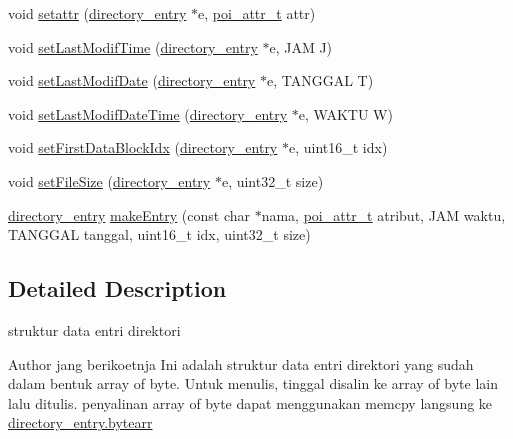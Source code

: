 \begin{DoxyCompactItemize}
\item 
void \hyperlink{directory-entry_8h_ab707665b70d7b489fea00097a365302b}{setattr} (\hyperlink{structdirectory__entry}{directory\-\_\-entry} $\ast$e, \hyperlink{structpoi__attr__t}{poi\-\_\-attr\-\_\-t} attr)
\item 
void \hyperlink{directory-entry_8h_a0dbc96b3055551072fccce217082e16a}{set\-Last\-Modif\-Time} (\hyperlink{structdirectory__entry}{directory\-\_\-entry} $\ast$e, J\-A\-M J)
\item 
void \hyperlink{directory-entry_8h_a0d6184c06efca3bd8ee3e3314de4013d}{set\-Last\-Modif\-Date} (\hyperlink{structdirectory__entry}{directory\-\_\-entry} $\ast$e, T\-A\-N\-G\-G\-A\-L T)
\item 
void \hyperlink{directory-entry_8h_afa6f9ebace0db1160a2b1b53dcf6bff0}{set\-Last\-Modif\-Date\-Time} (\hyperlink{structdirectory__entry}{directory\-\_\-entry} $\ast$e, W\-A\-K\-T\-U W)
\item 
void \hyperlink{directory-entry_8h_a4275d4bb22d8095e6319637119694d9a}{set\-First\-Data\-Block\-Idx} (\hyperlink{structdirectory__entry}{directory\-\_\-entry} $\ast$e, uint16\-\_\-t idx)
\item 
void \hyperlink{directory-entry_8h_a602a8f906599cd997e73640df620a514}{set\-File\-Size} (\hyperlink{structdirectory__entry}{directory\-\_\-entry} $\ast$e, uint32\-\_\-t size)
\item 
\hyperlink{structdirectory__entry}{directory\-\_\-entry} \hyperlink{directory-entry_8h_a9316a7dff46a87f98e3471031896670f}{make\-Entry} (const char $\ast$nama, \hyperlink{structpoi__attr__t}{poi\-\_\-attr\-\_\-t} atribut, J\-A\-M waktu, T\-A\-N\-G\-G\-A\-L tanggal, uint16\-\_\-t idx, uint32\-\_\-t size)
\end{DoxyCompactItemize}


\subsection{Detailed Description}
struktur data entri direktori \begin{DoxyAuthor}{Author}
jang berikoetnja Ini adalah struktur data entri direktori yang sudah dalam bentuk array of byte. Untuk menulis, tinggal disalin ke array of byte lain lalu ditulis. penyalinan array of byte dapat menggunakan memcpy langsung ke \hyperlink{structdirectory__entry_a380aef5511e7e06c9677a3ef970b32bc}{directory\-\_\-entry.\-bytearr} 
\end{DoxyAuthor}


